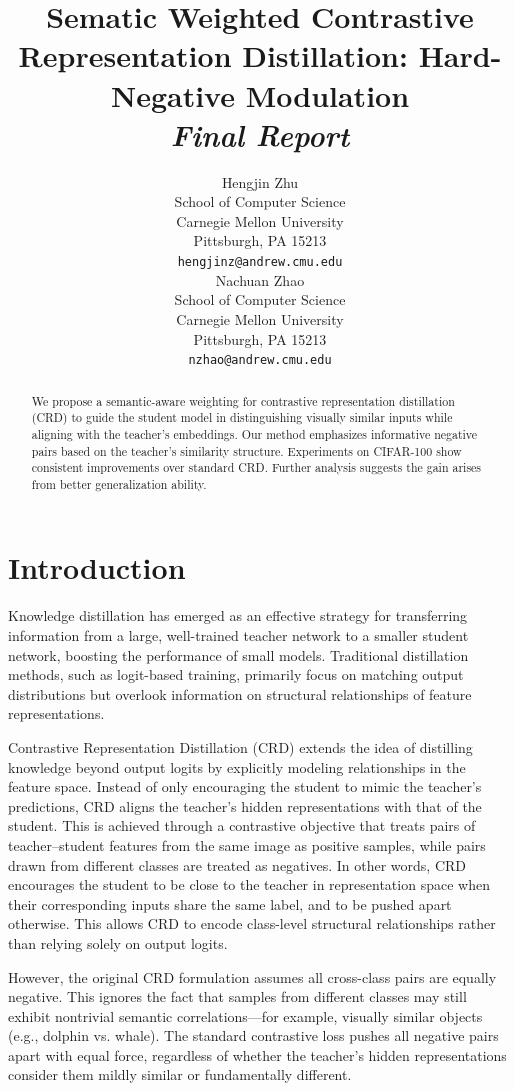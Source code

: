 \documentclass{article}
\title{Sematic Weighted Contrastive Representation Distillation: Hard-Negative Modulation\\
{\small \textit{Final Report}}}
\author{
  Hengjin Zhu\\
  School of Computer Science\\
  Carnegie Mellon University\\
  Pittsburgh, PA 15213 \\
  \texttt{hengjinz@andrew.cmu.edu} \\
  \And
  Nachuan Zhao\\
  School of Computer Science\\
  Carnegie Mellon University\\
  Pittsburgh, PA 15213 \\
  \texttt{nzhao@andrew.cmu.edu} \\
}
\theoremstyle{plain}
\theoremstyle{remark}
\begin{document}
\maketitle


\begin{abstract}
We propose a semantic-aware weighting for contrastive representation distillation (CRD) to guide the student model in distinguishing visually similar inputs while aligning with the teacher’s embeddings. Our method emphasizes informative negative pairs based on the teacher’s similarity structure. Experiments on CIFAR-100 show consistent improvements over standard CRD. Further analysis suggests the gain arises from better generalization ability.
\end{abstract}

\section{Introduction}
Knowledge distillation has emerged as an effective strategy for transferring information from a large, well-trained teacher network to a smaller student network, boosting the performance of small models. Traditional distillation methods, such as logit-based training, primarily focus on matching output distributions but  overlook information on structural relationships of feature representations. 

Contrastive Representation Distillation (CRD) extends the idea of distilling knowledge beyond output logits by explicitly modeling relationships in the feature space. Instead of only encouraging the student to mimic the teacher’s predictions, CRD aligns the teacher’s hidden representations with that of the student. This is achieved through a contrastive objective that treats pairs of teacher–student features from the same image  as positive samples, while pairs drawn from different classes are treated as negatives. In other words, CRD encourages the student to be close to the teacher in representation space when their corresponding inputs share the same label, and to be pushed apart otherwise. This allows CRD to encode class-level structural relationships rather than relying solely on output logits.

However, the original CRD formulation assumes all cross-class pairs are equally negative. This ignores the fact that samples from different classes may still exhibit nontrivial semantic correlations—for example,  visually similar objects (e.g., dolphin vs. whale). The standard contrastive loss pushes all negative pairs apart with equal force, regardless of whether the teacher’s hidden representations consider them mildly similar or fundamentally different.
\end{document}
